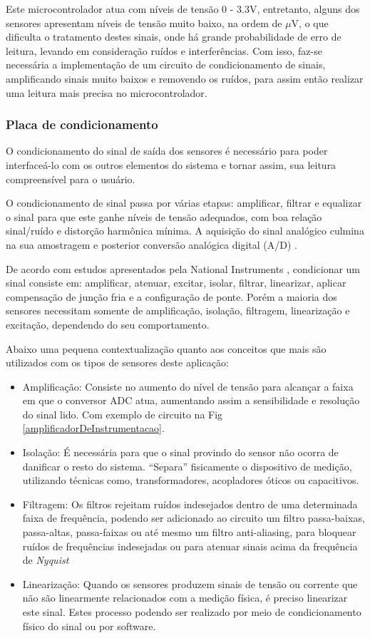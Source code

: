 Este microcontrolador atua com níveis de tensão 0 - 3.3V, entretanto, alguns dos sensores apresentam níveis de tensão muito baixo, na ordem de $\mu$V, o que dificulta o tratamento destes sinais, onde há grande probabilidade de erro de leitura, levando em consideração ruídos e interferências. Com isso, faz-se necessária a implementação de um circuito de condicionamento de sinais, amplificando sinais muito baixos e removendo os ruídos, para assim então realizar uma leitura mais precisa no microcontrolador.

\subsubsection{Placa de condicionamento}

O condicionamento do sinal de saída dos sensores é necessário para poder interfaceá-lo com os outros elementos do sistema e tornar assim, sua leitura compreensível para o usuário.

O condicionamento de sinal passa por várias etapas: amplificar, filtrar e equalizar o sinal para que este ganhe níveis de tensão adequados, com boa relação sinal/ruído e distorção harmônica mínima. A aquisição do sinal analógico culmina na sua amostragem e posterior conversão analógica digital (A/D) \cite{SMAR}.

De acordo com estudos apresentados pela National Instruments \cite{national01}, condicionar um sinal consiste em: amplificar, atenuar, excitar, isolar, filtrar, linearizar, aplicar compensação de junção fria e a configuração de ponte. Porém a maioria dos sensores necessitam somente de amplificação, isolação, filtragem, linearização e excitação, dependendo do seu comportamento.

Abaixo uma pequena contextualização quanto aos conceitos que mais são utilizados com os tipos de sensores deste aplicação:

\begin{itemize}
	\item Amplificação: Consiste no aumento do nível de tensão para alcançar a faixa em que o conversor ADC atua, aumentando assim a sensibilidade e resolução do sinal lido. Com exemplo de circuito na Fig \ref{amplificadorDeInstrumentacao}.
	\item Isolação: É necessária para que o sinal provindo do sensor não ocorra de danificar o resto do sistema. “Separa” fisicamente o dispositivo de medição, utilizando técnicas como, transformadores, acopladores óticos ou capacitivos.
	\item Filtragem: Os filtros rejeitam ruídos indesejados dentro de uma determinada faixa de frequência, podendo ser adicionado ao circuito um filtro passa-baixas, passa-altas, passa-faixas ou até mesmo um filtro anti-aliasing, para bloquear ruídos de frequências indesejadas ou para atenuar sinais acima da frequência de \textit{Nyquist}
	\item Linearização: Quando os sensores produzem sinais de tensão ou corrente que não são linearmente relacionados com a medição física, é preciso linearizar este sinal. Estes processo podendo ser realizado por meio de condicionamento físico do sinal ou por software.
\end{itemize}

